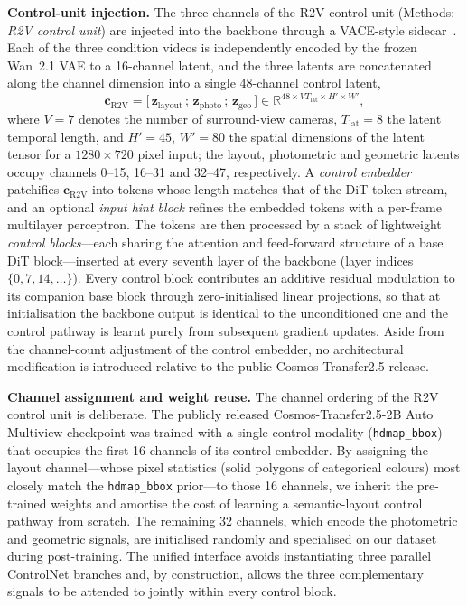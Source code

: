 \textbf{Control-unit injection.}
The three channels of the R2V control unit
(Methods: \emph{R2V control unit}) are injected into the
backbone through a VACE-style sidecar~\cite{jiang2025vace}.
Each of the three condition videos is independently encoded
by the frozen Wan~2.1 VAE to a 16-channel latent, and the
three latents are concatenated along the channel dimension
into a single 48-channel control latent,
%
\begin{equation}
  \label{eq:ctrl_cat}
  \mathbf{c}_{\mathrm{R2V}} =
  \big[\,\mathbf{z}_{\mathrm{layout}}\,;\,\mathbf{z}_{\mathrm{photo}}\,;\,\mathbf{z}_{\mathrm{geo}}\,\big]
  \in \mathbb{R}^{48\times V T_{\mathrm{lat}}\times H'\times W'},
\end{equation}
%
where $V\!=\!7$ denotes the number of surround-view cameras,
$T_{\mathrm{lat}}\!=\!8$ the latent temporal length, and
$H'\!=\!45$, $W'\!=\!80$ the spatial dimensions of the latent
tensor for a $1280\!\times\!720$ pixel input; the layout,
photometric and geometric latents occupy channels 0--15,
16--31 and 32--47, respectively. A \emph{control embedder}
patchifies $\mathbf{c}_{\mathrm{R2V}}$ into tokens whose
length matches that of the DiT token stream, and an optional
\emph{input hint block} refines the embedded tokens with a
per-frame multilayer perceptron. The tokens are then
processed by a stack of lightweight \emph{control
blocks}---each sharing the attention and feed-forward
structure of a base DiT block---inserted at every seventh
layer of the backbone (layer indices $\{0,7,14,\ldots\}$).
Every control block contributes an additive residual
modulation to its companion base block through
zero-initialised linear projections, so that at
initialisation the backbone output is identical to the
unconditioned one and the control pathway is learnt purely
from subsequent gradient updates. Aside from the
channel-count adjustment of the control embedder, no
architectural modification is introduced relative to the
public Cosmos-Transfer2.5 release.

\textbf{Channel assignment and weight reuse.}
The channel ordering of the R2V control unit is deliberate.
The publicly released Cosmos-Transfer2.5-2B Auto Multiview
checkpoint was trained with a single control modality
(\texttt{hdmap\_bbox})~\cite{cosmos2025transfer} that
occupies the first 16 channels of its control embedder. By
assigning the layout channel---whose pixel statistics (solid
polygons of categorical colours) most closely match the
\texttt{hdmap\_bbox} prior---to those 16 channels, we inherit
the pre-trained weights and amortise the cost of learning a
semantic-layout control pathway from scratch. The remaining
32 channels, which encode the photometric and geometric
signals, are initialised randomly and specialised on our
dataset during post-training. The unified interface avoids
instantiating three parallel ControlNet branches and, by
construction, allows the three complementary signals to be
attended to jointly within every control block.

